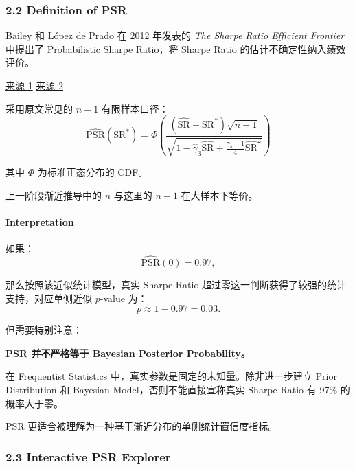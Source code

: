 \hypertarget{part-4-71-0001-definition-of-psr}{%
\subsubsection{2.2 Definition of PSR}\label{part-4-71-0001-definition-of-psr}}

Bailey 和 López de Prado 在 2012 年发表的 \emph{The Sharpe Ratio Efficient Frontier} 中提出了 Probabilistic Sharpe Ratio，将 Sharpe Ratio 的估计不确定性纳入绩效评价。

\href{https://papers.ssrn.com/sol3/papers.cfm?abstract_id=1821643.}{来源 1} \href{https://www.risk.net/journal-of-risk/volume-15-number-2-december-2012}{来源 2}

采用原文常见的 \(n-1\) 有限样本口径：
\[\boxed{
\widehat{\mathrm{PSR}}(\mathrm{SR}^*)
=
\Phi
\left(
\frac{
(\widehat{\mathrm{SR}}-\mathrm{SR}^*)\sqrt{n-1}
}{
\sqrt{
1-\hat\gamma_3\widehat{\mathrm{SR}}
+
\frac{\hat\gamma_4-1}{4}
\widehat{\mathrm{SR}}^2
}
}
\right)
}\]

其中 \(\Phi\) 为标准正态分布的 CDF。

上一阶段渐近推导中的 \(n\) 与这里的 \(n-1\) 在大样本下等价。

\hypertarget{part-4-71-0001-interpretation}{%
\paragraph{Interpretation}\label{part-4-71-0001-interpretation}}

如果：
\[\widehat{\mathrm{PSR}}(0)=0.97,\]

那么按照该近似统计模型，真实 Sharpe Ratio 超过零这一判断获得了较强的统计支持，对应单侧近似 \(p\)-value 为：
\[p\approx1-0.97=0.03.\]

但需要特别注意：

\textbf{PSR 并不严格等于 Bayesian Posterior Probability。}

在 Frequentist Statistics 中，真实参数是固定的未知量。除非进一步建立 Prior Distribution 和 Bayesian Model，否则不能直接宣称真实 Sharpe Ratio 有 97\% 的概率大于零。

PSR 更适合被理解为一种基于渐近分布的单侧统计置信度指标。

\hypertarget{part-4-71-0001-interactive-psr-explorer}{%
\subsubsection{2.3 Interactive PSR Explorer}\label{part-4-71-0001-interactive-psr-explorer}}

